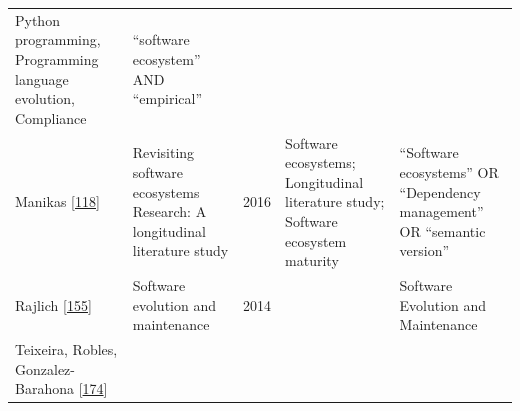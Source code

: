 \documentclass[]{book}
\begin{document}
\begin{longtable}[]{@{}lllll@{}}
\begin{minipage}[t]{0.34\columnwidth}
Python programming, Programming language evolution, Compliance\strut
\end{minipage} & \begin{minipage}[t]{0.13\columnwidth}\raggedright\strut
``software ecosystem'' AND ``empirical''\strut
\end{minipage}\tabularnewline
\begin{minipage}[t]{0.05\columnwidth}\raggedright\strut
Manikas {[}\protect\hyperlink{ref-Manikas2016}{118}{]}\strut
\end{minipage} & \begin{minipage}[t]{0.31\columnwidth}\raggedright\strut
Revisiting software ecosystems Research: A longitudinal literature
study\strut
\end{minipage} & \begin{minipage}[t]{0.02\columnwidth}\raggedright\strut
2016\strut
\end{minipage} & \begin{minipage}[t]{0.34\columnwidth}\raggedright\strut
Software ecosystems; Longitudinal literature study; Software ecosystem
maturity\strut
\end{minipage} & \begin{minipage}[t]{0.13\columnwidth}\raggedright\strut
``Software ecosystems'' OR ``Dependency management'' OR ``semantic
version''\strut
\end{minipage}\tabularnewline
\begin{minipage}[t]{0.05\columnwidth}\raggedright\strut
Rajlich {[}\protect\hyperlink{ref-Rajlich2014}{155}{]}\strut
\end{minipage} & \begin{minipage}[t]{0.31\columnwidth}\raggedright\strut
Software evolution and maintenance\strut
\end{minipage} & \begin{minipage}[t]{0.02\columnwidth}\raggedright\strut
2014\strut
\end{minipage} & \begin{minipage}[t]{0.34\columnwidth}\raggedright\strut
\strut
\end{minipage} & \begin{minipage}[t]{0.13\columnwidth}\raggedright\strut
Software Evolution and Maintenance\strut
\end{minipage}\tabularnewline
\begin{minipage}[t]{0.05\columnwidth}\raggedright\strut
Teixeira, Robles, Gonzalez-Barahona
{[}\protect\hyperlink{ref-Teixeira2015}{174}{]}\strut
\end{minipage} & \begin{minipage}[t]{0.31\columnwidth}\raggedright\strut

\end{minipage}
\end{longtable}
\end{document}

